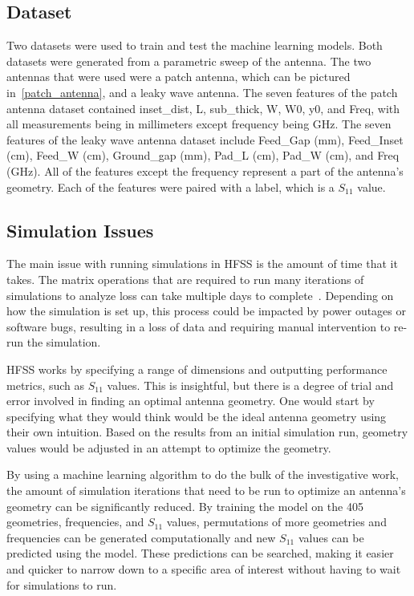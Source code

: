 \documentclass[lettersize,journal]{IEEEtran}
\begin{document}
\subsection{Dataset}
Two datasets were used to train and test the machine learning models. Both datasets were generated from a parametric sweep of the antenna. The two antennas that were used were a patch antenna, which can be pictured in~\ref{patch_antenna}, and a leaky wave antenna. The seven features of the patch antenna dataset contained inset\_dist, L, sub\_thick, W, W0, y0, and Freq, with all measurements being in millimeters except frequency being GHz. The seven features of the leaky wave antenna dataset include Feed\_Gap (mm), Feed\_Inset (cm), Feed\_W (cm), Ground\_gap (mm), Pad\_L (cm), Pad\_W (cm), and Freq (GHz). All of the features except the frequency represent a part of the antenna's geometry. Each of the features were paired with a label, which is a $S_{11}$ value.

\subsection{Simulation Issues}
The main issue with running simulations in HFSS is the amount of time that it takes. The matrix operations that are required to run many iterations of simulations to analyze loss can take multiple days to complete~\cite{john_antenna_2009,liu_efficient_2014}. Depending on how the simulation is set up, this process could be impacted by power outages or software bugs, resulting in a loss of data and requiring manual intervention to re-run the simulation. 

HFSS works by specifying a range of dimensions and outputting performance metrics, such as $S_{11}$ values. This is insightful, but there is a degree of trial and error involved in finding an optimal antenna geometry. One would start by specifying what they would think would be the ideal antenna geometry using their own intuition. Based on the results from an initial simulation run, geometry values would be adjusted in an attempt to optimize the geometry.

By using a machine learning algorithm to do the bulk of the investigative work, the amount of simulation iterations that need to be run to optimize an antenna's geometry can be significantly reduced. By training the model on the 405 geometries, frequencies, and $S_{11}$ values, permutations of more geometries and frequencies can be generated computationally and new $S_{11}$ values can be predicted using the model. These predictions can be searched, making it easier and quicker to narrow down to a specific area of interest without having to wait for simulations to run.
\end{document}
